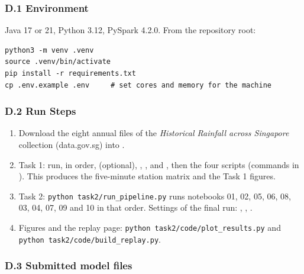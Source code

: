 \subsubsection*{D.1 Environment}
{}

Java 17 or 21, Python 3.12, PySpark 4.2.0. From the repository root:

\begin{verbatim}
python3 -m venv .venv
source .venv/bin/activate
pip install -r requirements.txt
cp .env.example .env     # set cores and memory for the machine
\end{verbatim}

\subsubsection*{D.2 Run Steps}
{}

\begin{enumerate}
\item Download the eight annual files of the \textit{Historical Rainfall across Singapore} collection (data.gov.sg) into .
\item Task 1: run, in order,  (optional), , ,  and , then the four  scripts (commands in ). This produces the five-minute station matrix  and the Task 1 figures.
\item Task 2: \texttt{python task2/run\_pipeline.py} runs notebooks 01, 02, 05, 06, 08, 03, 04, 07, 09 and 10 in that order. Settings of the final run: , , .
\item Figures and the replay page: \texttt{python task2/code/plot\_results.py} and \texttt{python task2/code/build\_replay.py}.
\end{enumerate}

\subsubsection*{D.3 Submitted model files}
{}

